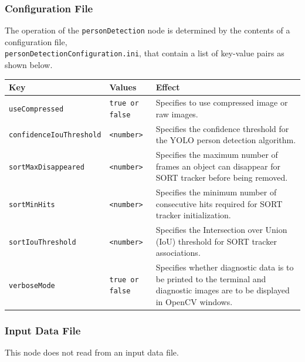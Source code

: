 \documentclass{CSSRforAfrica}
\begin{document}
{{\newpage

\subsubsection*{Configuration File}


The operation of the {\small \verb+personDetection+} node is determined by the contents of a configuration file, \\
{\small \verb+personDetectionConfiguration.ini+}, that  contain a list of key-value pairs as shown below.  

\begin{center}
\begin{tabularx}{\linewidth}{| l | l | X|}
\hline 
{\small Key }                               & {\small Values }                                                 &  {\small Effect}       \\
\hline
{\footnotesize \texttt{useCompressed}}  & {\footnotesize \texttt{true or false}}     & {\small Specifies to use compressed image or raw images.} \\
\hline
{\footnotesize \texttt{confidenceIouThreshold}}  & {\footnotesize \texttt{<number>}}     & {\small Specifies the confidence threshold for the YOLO person detection algorithm.} \\
\hline
{\footnotesize \texttt{sortMaxDisappeared}}  & {\footnotesize \texttt{<number>}}     & {\small Specifies the maximum number of frames an object can disappear for SORT tracker before being removed.} \\
\hline
{\footnotesize \texttt{sortMinHits}}  & {\footnotesize \texttt{<number>}}     & {\small Specifies the minimum number of consecutive hits required for SORT tracker initialization.} \\
\hline
{\footnotesize \texttt{sortIouThreshold}} & {\footnotesize \texttt{<number>}}     & {\small Specifies the Intersection over Union (IoU) threshold for SORT tracker associations.} \\
\hline
{\footnotesize \texttt{verboseMode}}  & {\footnotesize \texttt{true or false}}     & {\small Specifies whether diagnostic data is to be printed to the terminal and diagnostic images are to be displayed in OpenCV windows.} \\
\hline

\end{tabularx}
\end{center}


\subsubsection*{Input Data File}
This node does not read from an input data file.


}}
\end{document}
